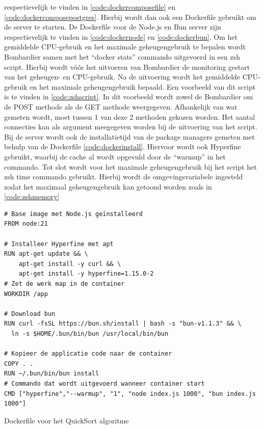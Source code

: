 respectievelijk te vinden in \ref{code:dockercomposefile} en \ref{code:dockercomposepostgres}.
Hierbij wordt dan ook een Dockerfile gebruikt om de server te starten. De Dockerfile voor de Node.js en Bun server 
zijn respectievelijk te vinden in \ref{code:dockernode} en \ref{code:dockerbun}. 
Om het gemiddelde CPU-gebruik en het maximale geheugengebruik te bepalen wordt Bombardier samen met het “docker stats” commando uitgevoerd in een zsh script.
Hierbij wordt vóór het uitvoeren van Bombardier de monitoring gestart van het geheugen- en CPU-gebruik. 
Na de uitvoering wordt het gemiddelde CPU-gebruik en het maximale geheugengebruik bepaald.
Een voorbeeld van dit script is te vinden in \ref{code:zshscript}. 
In dit voorbeeld wordt zowel de Bombardier om de POST methode als de GET methode weergegeven. Afhankelijk van wat gemeten wordt, moet tussen 1 van deze 2 methoden gekozen worden.
Het aantal connecties kan als argument meegegeven worden bij de uitvoering van het script.
Bij de server wordt ook de installatietijd van de package managers gemeten met behulp van de Dockerfile \ref{code:dockerinstall}.
Hiervoor wordt ook Hyperfine gebruikt, waarbij de cache al wordt opgevuld door de “warmup” in het commando.
Tot slot wordt voor het maximale geheugengebruik bij het script het zsh time commando gebruikt. Hierbij wordt de omgevingsvariabele 
ingesteld zodat het maximaal geheugengebruik kan getoond worden zoals in \ref{code:zshmemory}
\begin{listing}[H]
  \centering
  \begin{verbatim}
# Base image met Node.js geïnstalleerd
FROM node:21

# Installeer Hyperfine met apt
RUN apt-get update && \
    apt-get install -y curl && \
    apt-get install -y hyperfine=1.15.0-2
# Zet de werk map in de container
WORKDIR /app

# Download bun
RUN curl -fsSL https://bun.sh/install | bash -s "bun-v1.1.3" && \
  ln -s $HOME/.bun/bin/bun /usr/local/bin/bun

# Kopieer de applicatie code naar de container
COPY . .
RUN ~/.bun/bin/bun install
# Commando dat wordt uitgevoerd wanneer container start
CMD ["hyperfine","--warmup", "1", "node index.js 1000", "bun index.js 1000"]
      \end{verbatim}
      \caption[Dockerfile QuickSort algoritme]{\label{code:dockerscript}Dockerfile voor het QuickSort algoritme}
\end{listing}
